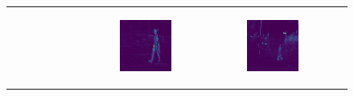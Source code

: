 \begin{figure}
\begin{tabular}{r p{\horspace} p{\horspace} p{\horspace}}
\begin{subfigure}[b]{\subfigwidth}
    \end{subfigure}
    \hfill &
    \begin{subfigure}[b]{\subfigwidth}
        \includegraphics[width=\subfigwidth]{images/vit_attention/2/attn-head3.png}
    \end{subfigure} 
    \hfill &
    \begin{subfigure}[b]{\subfigwidth}
        \includegraphics[width=\subfigwidth]{images/vit_attention/4/attn-head3.png}

\end{subfigure}
\end{tabular}
\end{figure}
